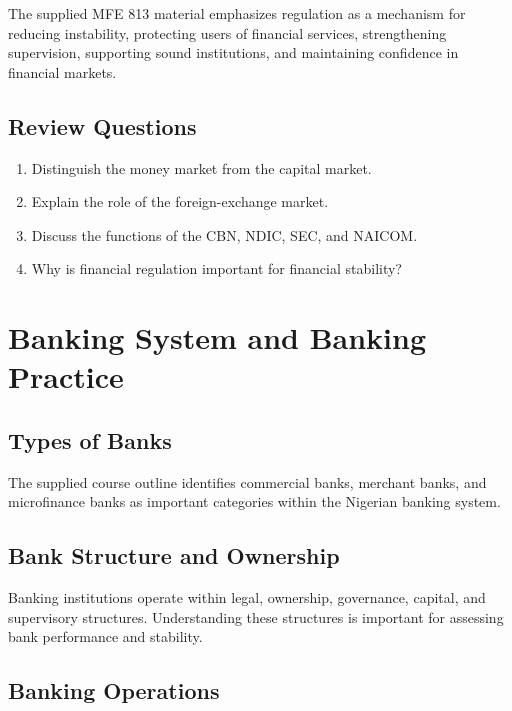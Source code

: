 \documentclass[
]{article}
\providecommand{\tightlist}{%
  \setlength{\itemsep}{0pt}\setlength{\parskip}{0pt}}
\begin{document}
The supplied MFE 813 material emphasizes regulation as a mechanism for reducing instability, protecting users of financial services, strengthening supervision, supporting sound institutions, and maintaining confidence in financial markets.

\subsection{Review Questions}\label{review-questions-3}

\begin{enumerate}
\def\labelenumi{\arabic{enumi}.}
\tightlist
\item
  Distinguish the money market from the capital market.
\item
  Explain the role of the foreign-exchange market.
\item
  Discuss the functions of the CBN, NDIC, SEC, and NAICOM.
\item
  Why is financial regulation important for financial stability?
\end{enumerate}

\section{Banking System and Banking Practice}\label{banking-system-and-banking-practice}

\subsection{Types of Banks}\label{types-of-banks}

The supplied course outline identifies commercial banks, merchant banks, and microfinance banks as important categories within the Nigerian banking system.

\subsection{Bank Structure and Ownership}\label{bank-structure-and-ownership}

Banking institutions operate within legal, ownership, governance, capital, and supervisory structures. Understanding these structures is important for assessing bank performance and stability.

\subsection{Banking Operations}\label{banking-operations}
\end{document}
